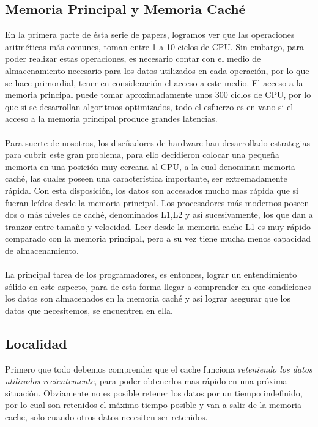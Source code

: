 \subsection{Memoria Principal y Memoria Caché}

	En la primera parte de ésta serie de papers, logramos ver que 
las operaciones aritméticas más comunes, toman entre 1 a 10 ciclos de 
CPU. Sin embargo, para poder realizar estas operaciones, es necesario
 contar con el medio de almacenamiento necesario para los datos utilizados
 en cada operación, por lo que se hace primordial, tener en consideración 
el acceso a este medio. El acceso a la memoria principal puede tomar
 aproximadamente unos 300 ciclos de CPU, por lo que si se desarrollan 
algoritmos optimizados, todo el esfuerzo es en vano si el acceso a la 
memoria principal produce grandes latencias.\\\\
	Para suerte de nosotros, los diseñadores de hardware han desarrollado
 estrategias para cubrir este gran problema, para ello decidieron colocar una
 pequeña memoria en una posición muy cercana al CPU, a la cual denominan memoria
 caché, las cuales poseen una característica importante, ser extremadamente 
rápida. Con esta disposición, los datos son accesados mucho mas rápida que si
 fueran leídos desde la memoria principal. Los procesadores más modernos poseen 
dos o más niveles de caché, denominados L1,L2 y así sucesivamente, los que dan 
a tranzar entre tamaño y velocidad. Leer desde la memoria cache L1 es muy rápido
 comparado con la memoria principal, pero a su vez tiene mucha menos capacidad 
de almacenamiento.\\\\
	La principal tarea de los programadores, es entonces, lograr un 
entendimiento sólido en este aspecto, para de esta forma llegar a comprender
 en que condiciones los datos son almacenados en la memoria caché y así lograr
 asegurar que los datos que necesitemos, se encuentren en ella.

\subsection{Localidad}

Primero que todo debemos comprender que el cache funciona \emph{reteniendo los datos utilizados recientemente},
para poder obtenerlos mas rápido en una próxima situación.
Obviamente no es posible retener los datos por un tiempo indefinido,
por lo cual son retenidos el máximo tiempo posible y van a salir de la memoria cache,
solo cuando otros datos necesiten ser retenidos.

